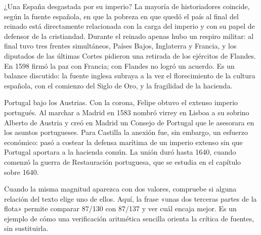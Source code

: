 \documentclass{book}
\begin{document}

¿Una España desgastada por su imperio?
La mayoría de historiadores coincide, según la fuente española, en que la pobreza en que quedó el país al final del reinado está directamente relacionada con la carga del imperio y con su papel de defensor de la cristiandad. Durante el reinado apenas hubo un respiro militar: al final tuvo tres frentes simultáneos, Países Bajos, Inglaterra y Francia, y los diputados de las últimas Cortes pidieron una retirada de los ejércitos de Flandes. En 1598 firmó la paz con Francia; con Flandes no logró un acuerdo. Es un balance discutido: la fuente inglesa subraya a la vez el florecimiento de la cultura española, con el comienzo del Siglo de Oro, y la fragilidad de la hacienda.


\begin{tcolorbox}[title={Consejo}, studiumtip, breakable]

Portugal bajo los Austrias. Con la corona, Felipe obtuvo el extenso imperio portugués. Al marchar a Madrid en 1583 nombró virrey en Lisboa a su sobrino Alberto de Austria y creó en Madrid un Consejo de Portugal que le asesorara en los asuntos portugueses. Para Castilla la anexión fue, sin embargo, un esfuerzo económico: pasó a costear la defensa marítima de un imperio extenso sin que Portugal aportara a la hacienda común. La unión duró hasta 1640, cuando comenzó la guerra de Restauración portuguesa, que se estudia en el capítulo sobre 1640.


Cuando la misma magnitud aparezca con dos valores, compruebe si alguna relación del texto elige uno de ellos. Aquí, la frase «unas dos terceras partes de la flota» permite comparar 87/130 con 87/137 y ver cuál encaja mejor. Es un ejemplo de cómo una verificación aritmética sencilla orienta la crítica de fuentes, sin sustituirla.

\end{tcolorbox}
\end{document}
